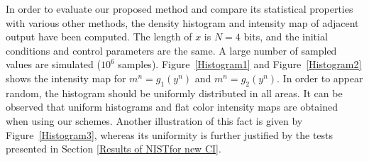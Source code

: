 In order to evaluate our proposed method and compare its statistical properties with various other methods, the density histogram and intensity map of adjacent output have been computed. The length of $x$ is $N = 4$ bits, and the initial conditions and control
parameters are the same. A large number of
sampled values are simulated ($10^6$ samples). 
Figure~\ref{Histogram1} and Figure~\ref{Histogram2} shows the intensity map for $m^n=g_1(y^n)$ and $m^n=g_2(y^n)$.
In order to appear random, the histogram should be uniformly distributed in all areas. 
It can be observed that uniform histograms and flat color intensity maps are obtained when using our schemes. 
Another illustration of this fact is given by Figure~\ref{Histogram3}, whereas its uniformity is further justified by the tests presented in Section \ref{Results of NISTfor new CI}.


